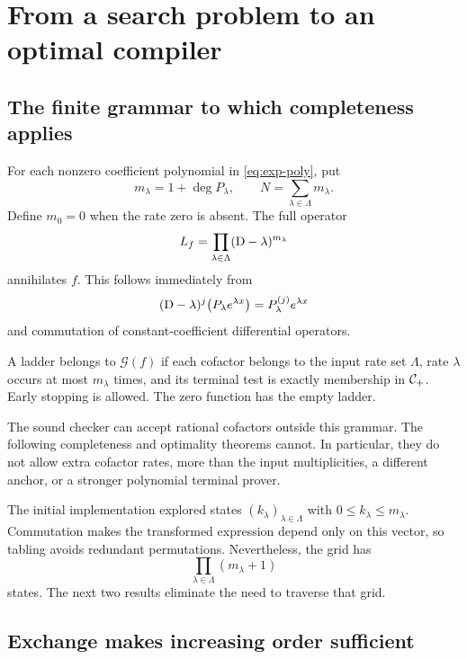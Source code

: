 \section{From a search problem to an optimal compiler}
\label{sec:optimal}

\subsection{The finite grammar to which completeness applies}

For each nonzero coefficient polynomial in \eqref{eq:exp-poly}, put
\[
 m_\lambda=1+\deg P_\lambda,
 \qquad N=\sum_{\lambda\in\Lambda}m_\lambda.
\]
Define $m_0=0$ when the rate zero is absent. The full operator
\begin{equation}
 L_f=\prod_{\lambda\in\Lambda}(\mathrm D-\lambda)^{m_\lambda}
 \label{eq:annihilator}
\end{equation}
annihilates $f$. This follows immediately from
\[
 (\mathrm D-\lambda)^j\bigl(P_\lambda e^{\lambda x}\bigr)
 =P_\lambda^{(j)}e^{\lambda x}
\]
and commutation of constant-coefficient differential operators.

\begin{definition}
\label{def:grammar}
A ladder belongs to $\mathcal G(f)$ if each cofactor belongs to the input rate set $\Lambda$, rate $\lambda$ occurs at most $m_\lambda$ times, and its terminal test is exactly membership in $\mathcal C_+$. Early stopping is allowed. The zero function has the empty ladder.
\end{definition}

The sound checker can accept rational cofactors outside this grammar. The following completeness and optimality theorems cannot. In particular, they do not allow extra cofactor rates, more than the input multiplicities, a different anchor, or a stronger polynomial terminal prover.

The initial implementation explored states $(k_\lambda)_{\lambda\in\Lambda}$ with $0\le k_\lambda\le m_\lambda$. Commutation makes the transformed expression depend only on this vector, so tabling avoids redundant permutations. Nevertheless, the grid has
\begin{equation}
 \prod_{\lambda\in\Lambda}(m_\lambda+1)
 \label{eq:grid}
\end{equation}
states. The next two results eliminate the need to traverse that grid.

\subsection{Exchange makes increasing order sufficient}

